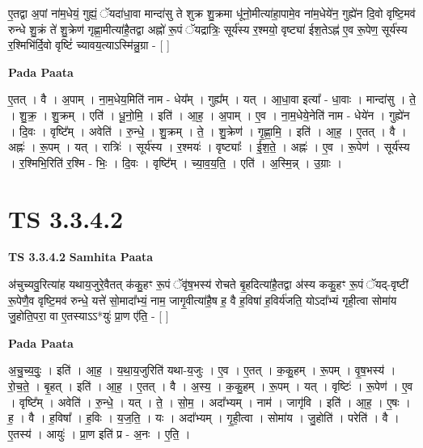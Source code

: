 \documentclass[17pt]{extarticle}
\begin{document}
ए॒तद्वा अ॒पां ना॑म॒धेयं॒ गुह्यं॒ ॅयदा॑धा॒वा मान्दा॑सु ते शुक्र शु॒क्रमा धू॑नो॒मीत्या॑हा॒पामे॒व ना॑म॒धेये॑न॒ गुह्ये॑न दि॒वो वृष्टि॒मव॑ रुन्धे शु॒क्रं ते॑ शु॒क्रेण॑ गृह्णा॒मीत्या॑है॒तद्वा अह्नो॑ रू॒पं ॅयद्रात्रिः॒ सूर्य॑स्य र॒श्मयो॒ वृष्ट्या॑ ईश॒तेऽह्न॑ ए॒व रू॒पेण॒ सूर्य॑स्य र॒श्मिभि॑र्दि॒वो वृष्टिं॑ च्यावय॒त्याऽस्मि॑न्नु॒ग्रा - [  ] \newline

\textbf{Pada Paata} \newline

ए॒तत् । वै । अ॒पाम् । ना॒म॒धेय॒मिति॑ नाम - धेय᳚म् । गुह्य᳚म् । यत् । आ॒धा॒वा इत्या᳚ - धा॒वाः । मान्दा॑सु । ते॒ । शु॒क्र॒ । शु॒क्रम् । एति॑ । धू॒नो॒मि॒ । इति॑ । आ॒ह॒ । अ॒पाम् । ए॒व । ना॒म॒धेये॒नेति॑ नाम - धेये॑न । गुह्ये॑न । दि॒वः । वृष्टि᳚म् । अवेति॑ । रु॒न्धे॒ । शु॒क्रम् । ते॒ । शु॒क्रेण॑ । गृ॒ह्णा॒मि॒ । इति॑ । आ॒ह॒ । ए॒तत् । वै । अह्नः॑ । रू॒पम् । यत् । रात्रिः॑ । सूर्य॑स्य । र॒श्मयः॑ । वृष्ट्याः᳚ । ई॒श॒ते॒ । अह्नः॑ । ए॒व । रू॒पेण॑ । सूर्य॑स्य । र॒श्मिभि॒रिति॑ र॒श्मि - भिः॒ । दि॒वः । वृष्टि᳚म् । च्या॒व॒य॒ति॒ । एति॑ । अ॒स्मि॒न्न् । उ॒ग्राः ।  \newline





\section{ TS 3.3.4.2 }

\textbf{TS 3.3.4.2 } \newline
\textbf{Samhita Paata} \newline

अ॑चुच्यवु॒रित्या॑ह यथाय॒जुरे॒वैतत् क॑कु॒हꣳ रू॒पं ॅवृ॑ष॒भस्य॑ रोचते बृ॒हदित्या॑है॒तद्वा अ॑स्य ककु॒हꣳ रू॒पं ॅयद्-वृष्टी॑ रू॒पेणै॒व वृष्टि॒मव॑ रुन्धे॒ यत्ते॑ सो॒मादा᳚भ्यं॒ नाम॒ जागृ॒वीत्या॑है॒ष ह॒ वै ह॒विषा॑ ह॒विर्य॑जति॒ योऽदा᳚भ्यं गृही॒त्वा सोमा॑य जु॒होति॒परा॒ वा ए॒तस्याऽऽ*युः॑ प्रा॒ण ए॑ति॒ - [  ] \newline

\textbf{Pada Paata} \newline

अ॒चु॒च्य॒वुः॒ । इति॑ । आ॒ह॒ । य॒था॒य॒जुरिति॑ यथा-य॒जुः । ए॒व । ए॒तत् । क॒कु॒हम् । रू॒पम् । वृ॒ष॒भस्य॑ । रो॒च॒ते॒ । बृ॒हत् । इति॑ । आ॒ह॒ । ए॒तत् । वै । अ॒स्य॒ । क॒कु॒हम् । रू॒पम् । यत् । वृष्टिः॑ । रू॒पेण॑ । ए॒व । वृष्टि᳚म् । अवेति॑ । रु॒न्धे॒ । यत् । ते॒ । सो॒म॒ । अदा᳚भ्यम् । नाम॑ । जागृ॑वि । इति॑ । आ॒ह॒ । ए॒षः । ह॒ । वै । ह॒विषा᳚ । ह॒विः । य॒ज॒ति॒ । यः । अदा᳚भ्यम् । गृ॒ही॒त्वा । सोमा॑य । जु॒होति॑ । परेति॑ । वै । ए॒तस्य॑ । आयुः॑ । प्रा॒ण इति॑ प्र - अ॒नः । ए॒ति॒ ।  \newline
\end{document}
